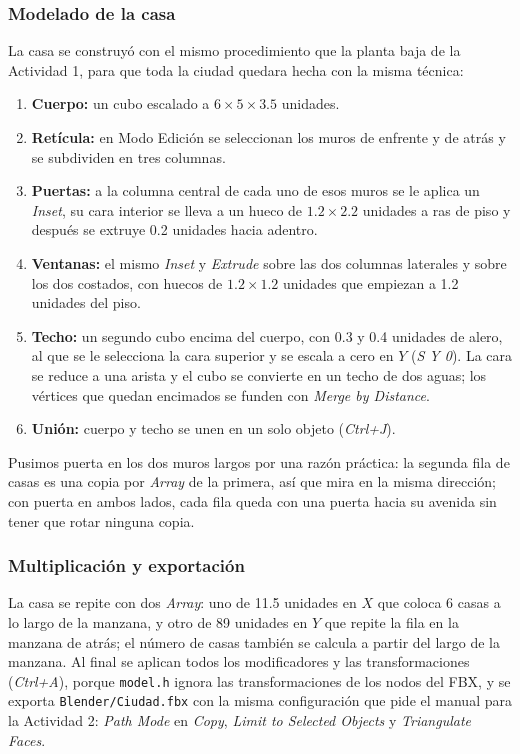 \subsubsection{Modelado de la casa}
La casa se construyó con el mismo procedimiento que la planta baja de la Actividad 1, para que toda la ciudad quedara hecha con la misma técnica:
\begin{enumerate}
    \item \textbf{Cuerpo:} un cubo escalado a $6 \times 5 \times 3.5$ unidades.
    \item \textbf{Retícula:} en Modo Edición se seleccionan los muros de enfrente y de atrás y se subdividen en tres columnas.
    \item \textbf{Puertas:} a la columna central de cada uno de esos muros se le aplica un \textit{Inset}, su cara interior se lleva a un hueco de $1.2 \times 2.2$ unidades a ras de piso y después se extruye 0.2 unidades hacia adentro.
    \item \textbf{Ventanas:} el mismo \textit{Inset} y \textit{Extrude} sobre las dos columnas laterales y sobre los dos costados, con huecos de $1.2 \times 1.2$ unidades que empiezan a 1.2 unidades del piso.
    \item \textbf{Techo:} un segundo cubo encima del cuerpo, con 0.3 y 0.4 unidades de alero, al que se le selecciona la cara superior y se escala a cero en $Y$ (\textit{S Y 0}). La cara se reduce a una arista y el cubo se convierte en un techo de dos aguas; los vértices que quedan encimados se funden con \textit{Merge by Distance}.
    \item \textbf{Unión:} cuerpo y techo se unen en un solo objeto (\textit{Ctrl+J}).
\end{enumerate}
Pusimos puerta en los dos muros largos por una razón práctica: la segunda fila de casas es una copia por \textit{Array} de la primera, así que mira en la misma dirección; con puerta en ambos lados, cada fila queda con una puerta hacia su avenida sin tener que rotar ninguna copia.

\subsubsection{Multiplicación y exportación}
La casa se repite con dos \textit{Array}: uno de 11.5 unidades en $X$ que coloca 6 casas a lo largo de la manzana, y otro de 89 unidades en $Y$ que repite la fila en la manzana de atrás; el número de casas también se calcula a partir del largo de la manzana. Al final se aplican todos los modificadores y las transformaciones (\textit{Ctrl+A}), porque \texttt{model.h} ignora las transformaciones de los nodos del FBX, y se exporta \texttt{Blender/Ciudad.fbx} con la misma configuración que pide el manual para la Actividad 2: \textit{Path Mode} en \textit{Copy}, \textit{Limit to Selected Objects} y \textit{Triangulate Faces}.

